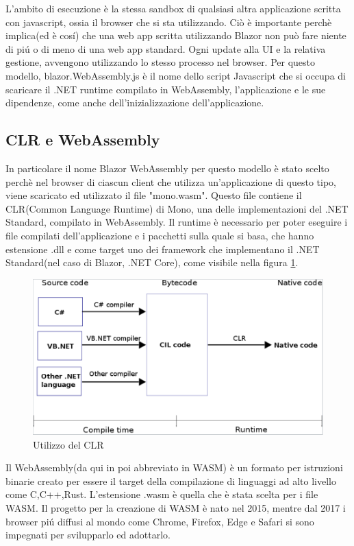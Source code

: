 L'ambito di esecuzione \`e la stessa sandbox di qualsiasi altra applicazione scritta con javascript, ossia il browser che si sta utilizzando.
Ci\`o \`e importante perch\`e implica(ed \`e cos\'i) che una web app scritta utilizzando Blazor non pu\`o fare niente di pi\'u o di meno di una web app standard.
Ogni update alla UI e la relativa gestione, avvengono utilizzando lo stesso processo nel browser.
Per questo modello, blazor.WebAssembly.js \`e il nome dello script Javascript che si occupa di scaricare il .NET runtime compilato in WebAssembly, l'applicazione e le sue dipendenze, come anche dell'inizializzazione dell'applicazione.

\subsection{CLR e WebAssembly}\label{sez:webAssembly}
In particolare il nome Blazor WebAssembly per questo modello \`e stato scelto perch\`e nel browser di ciascun client che utilizza un'applicazione di questo tipo, viene scaricato ed utilizzato il file "mono.wasm".
Questo file contiene il CLR(Common Language Runtime) di Mono, una delle implementazioni del .NET Standard, compilato in WebAssembly.
Il runtime \`e necessario per poter eseguire i file compilati dell'applicazione e i pacchetti sulla quale si basa, che hanno estensione .dll e come target uno dei framework che implementano il .NET Standard(nel caso di Blazor, .NET Core), come visibile nella figura \ref{fig:CLR}.

\begin{figure}[H]
	\centerline{\includegraphics[scale=0.5]{figure/CLR.PNG}}
	\caption{Utilizzo del CLR}
	\label{fig:CLR}
\end{figure}

Il WebAssembly(da qui in poi abbreviato in WASM) \`e un formato per istruzioni binarie creato per essere il target della compilazione di linguaggi ad alto livello come C,C++,Rust\cite{webAssemblyOfficialWebsite}.
L'estensione .wasm \`e quella che \`e stata scelta per i file WASM.
Il progetto per la creazione di WASM \`e nato nel 2015, mentre dal 2017 i browser pi\'u diffusi al mondo come Chrome, Firefox, Edge e Safari si sono impegnati per svilupparlo ed adottarlo.\cite{webAssemblySupport}

